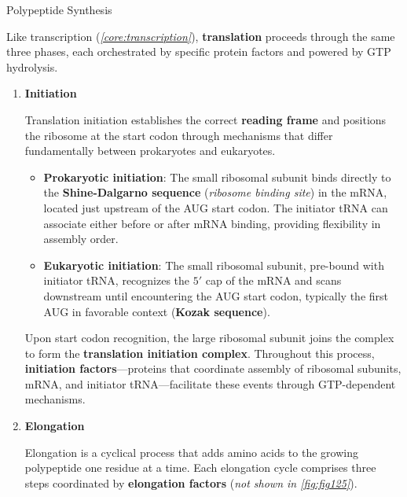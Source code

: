 \documentclass[10pt]{article}
\begin{document}
    \begin{core}[label=core:polypeptide_synthesis]{Polypeptide Synthesis}

      Like transcription (\textit{\autoref{core:transcription}}), \textbf{translation} proceeds through the same three phases, each orchestrated by specific protein factors and powered by GTP hydrolysis.
      
      \begin{enumerate}

        \item \textbf{Initiation}


        Translation initiation establishes the correct \textbf{reading frame} and positions the ribosome at the start codon through mechanisms that differ fundamentally between prokaryotes and eukaryotes.

        \begin{itemize}

          \item \textbf{Prokaryotic initiation}: The small ribosomal subunit binds directly to the \textbf{Shine-Dalgarno sequence} (\textit{ribosome binding site}) in the mRNA, located just upstream of the AUG start codon. The initiator tRNA can associate either before or after mRNA binding, providing flexibility in assembly order.
          
          \item \textbf{Eukaryotic initiation}: The small ribosomal subunit, pre-bound with initiator tRNA, recognizes the $5'$ cap of the mRNA and scans downstream until encountering the AUG start codon, typically the first AUG in favorable context (\textbf{Kozak sequence}).

        \end{itemize}

        Upon start codon recognition, the large ribosomal subunit joins the complex to form the \textbf{translation initiation complex}. Throughout this process, \textbf{initiation factors}---proteins that coordinate assembly of ribosomal subunits, mRNA, and initiator tRNA---facilitate these events through GTP-dependent mechanisms.
 
        \item \textbf{Elongation}

        Elongation is a cyclical process that adds amino acids to the growing polypeptide one residue at a time. Each elongation cycle comprises three steps coordinated by \textbf{elongation factors} (\textit{not shown in \autoref{fig:fig125}}).


\end{enumerate}
\end{core}
\end{document}
